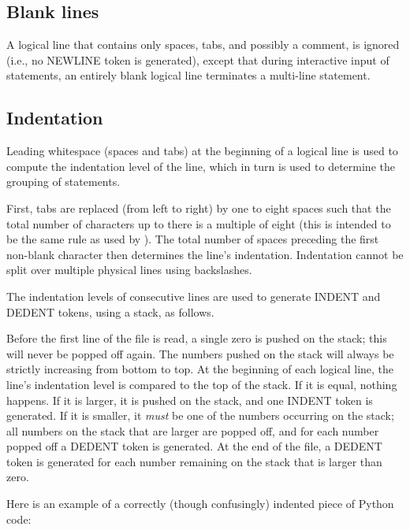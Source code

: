 \subsection{Blank lines}

A logical line that contains only spaces, tabs, and possibly a
comment, is ignored (i.e., no NEWLINE token is generated), except that
during interactive input of statements, an entirely blank logical line
terminates a multi-line statement.

\subsection{Indentation}

Leading whitespace (spaces and tabs) at the beginning of a logical
line is used to compute the indentation level of the line, which in
turn is used to determine the grouping of statements.

First, tabs are replaced (from left to right) by one to eight spaces
such that the total number of characters up to there is a multiple of
eight (this is intended to be the same rule as used by {\UNIX}).  The
total number of spaces preceding the first non-blank character then
determines the line's indentation.  Indentation cannot be split over
multiple physical lines using backslashes.

The indentation levels of consecutive lines are used to generate
INDENT and DEDENT tokens, using a stack, as follows.

Before the first line of the file is read, a single zero is pushed on
the stack; this will never be popped off again.  The numbers pushed on
the stack will always be strictly increasing from bottom to top.  At
the beginning of each logical line, the line's indentation level is
compared to the top of the stack.  If it is equal, nothing happens.
If it is larger, it is pushed on the stack, and one INDENT token is
generated.  If it is smaller, it {\em must} be one of the numbers
occurring on the stack; all numbers on the stack that are larger are
popped off, and for each number popped off a DEDENT token is
generated.  At the end of the file, a DEDENT token is generated for
each number remaining on the stack that is larger than zero.

Here is an example of a correctly (though confusingly) indented piece
of Python code:

